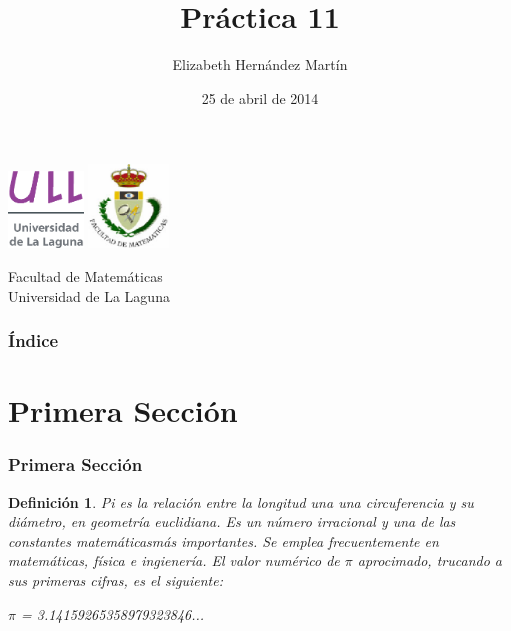\documentclass{beamer}
\title[Número &\pi&]{Práctica 11}
\author[Elizabeth]{Elizabeth Hernández Martín}
\date[25-04-2014]{25 de abril de 2014}
\newtheorem{definicion}{Definición}
\begin{document}
  
\begin{frame}

  \includegraphics[width=0.15\textwidth]{img/ullesc}
  \hspace*{7.0cm}
  \includegraphics[width=0.16\textwidth]{img/fmatesc}
  \titlepage

  \begin{small}
    \begin{center}
     Facultad de Matemáticas \\
     Universidad de La Laguna
    \end{center}
  \end{small}

\end{frame}

\begin{frame}
  \frametitle{Índice}  
  \tableofcontents[pausesections]
\end{frame}


\section{Primera Sección}


\begin{frame}

\frametitle{Primera Sección}

\begin{definicion}

Pi es la relación entre la longitud una una circuferencia y su diámetro, en geometría euclidiana.
Es un número irracional y una de las constantes matemáticasmás importantes. Se emplea frecuentemente 
en matemáticas, física e ingienería. El valor numérico de $\pi$ aprocimado, trucando a sus primeras cifras, 
es el siguiente:

$\pi$ = 3.14159265358979323846...

\end{definicion}

\end{frame}
\end{document}
